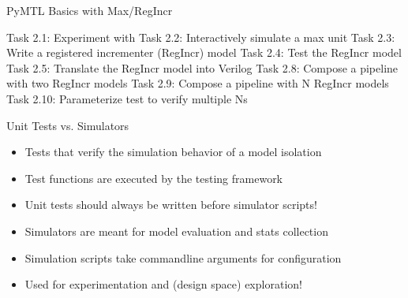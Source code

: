 \begin{frame}{ PyMTL Basics with Max/RegIncr}
\begin{cbxlist}
  \1 Task 2.1: Experiment with 
  \1 Task 2.2: Interactively simulate a max unit
  \1 Task 2.3: Write a registered incrementer (RegIncr) model
  \1 Task 2.4: Test the RegIncr model
  \1 Task 2.5: Translate the RegIncr model into Verilog
  \1 
  \1 
  \1 Task 2.8: Compose a pipeline with two RegIncr models
  \1 Task 2.9: Compose a pipeline with N RegIncr models
  \1 Task 2.10: Parameterize test to verify multiple Ns
\end{cbxlist}
\end{frame}

\begin{frame}{Unit Tests vs. Simulators}

 
\begin{itemize}
  \item Tests that verify the simulation behavior of a model isolation
  \item Test functions are executed by the  testing framework
  \item Unit tests should always be written before simulator scripts!
\end{itemize}

\vspace{0.2in}

 
\begin{itemize}
  \item Simulators are meant for model evaluation and stats collection
  \item Simulation scripts take commandline arguments for configuration
  \item Used for experimentation and (design space) exploration!
\end{itemize}

\end{frame}

